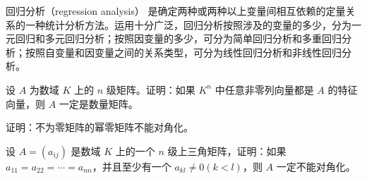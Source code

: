 \begin{conclusion}
回归分析（regression analysis） 是确定两种或两种以上变量间相互依赖的定量关系的一种统计分析方法。运用十分广泛，回归分析按照涉及的变量的多少，分为一元回归和多元回归分析；按照因变量的多少，可分为简单回归分析和多重回归分析；按照自变量和因变量之间的关系类型，可分为线性回归分析和非线性回归分析。
\end{conclusion}

\begin{problemset}
\item 设 $A$ 为数域 $K$ 上的 $n$ 级矩阵。证明：如果 $K^n$ 中任意非零列向量都是 $A$ 的特征向量，则 $A$ 一定是数量矩阵。
\item 证明：不为零矩阵的幂零矩阵不能对角化。
\item 设 $A = (a_{ij})$ 是数域 $K$ 上的一个 $n$ 级上三角矩阵，证明：如果 $a_{11} = a_{22} = \cdots = a_{nn}$，并且至少有一个 $a_{kl} \not = 0 (k < l)$，则 $A$ 一定不能对角化。
\end{problemset}

